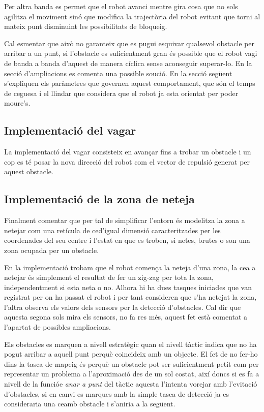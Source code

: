 Per altra banda es permet que el robot avanci mentre gira cosa que no sols agilitza el moviment sinó que
modifica la trajectòria del robot evitant que torni al mateix punt disminuint les possibilitats de bloqueig.

Cal esmentar que això no garanteix que es pugui esquivar qualsevol obstacle per arribar a un punt, 
si l'obstacle es suficientment gran és possible que el robot vagi de banda a banda d'aquest de manera
cíclica sense aconseguir superar-lo. En la secció d'ampliacions es comenta una possible so\lgem ució. En
la secció següent s'expliquen els paràmetres que governen aquest comportament, que són el temps
de ceguesa i el llindar que considera que el robot ja esta orientat per poder moure's.

\subsection{Implementació del vagar}

La implementació del vagar consisteix en avançar fins a trobar un obstacle i un cop es té posar 
la nova direcció del robot com el vector de repulsió generat per aquest obstacle.

\subsection{Implementació de la zona de neteja}

Finalment comentar que per tal de simplificar l'entorn és modelitza la zona a netejar com una retícula
de ce\lgem d'igual dimensió caracteritzades per les coordenades del seu centre i l'estat en que es troben,
si netes, brutes o son una zona ocupada per un obstacle.

En la implementació trobam que el robot comença la neteja d'una zona, la ce\lgem a a netejar és simplement
el resultat de fer un zig-zag per tota la zona, independentment si esta neta o no. Alhora hi ha dues tasques
iniciades que van registrat per on ha passat el robot i per tant consideren que s'ha netejat la zona, l'altra
observa els valors dels sensors per la detecció d'obstacles. Cal dir que aquesta segona sols mira els sensors,
no fa res més, aquest fet està comentat a l'apartat de possibles ampliacions.

Els obstacles es marquen a nivell estratègic quan el nivell tàctic indica que no ha pogut arribar a aquell
punt perquè coincideix amb un objecte. El fet de no fer-ho dins la tasca de mapeig és perquè un obstacle
pot ser suficientment petit com per representar un problema a l'aproximació des de un sol costat, així doncs
si es fa a nivell de la funcióe \emph{anar a punt} del tàctic aquesta l'intenta vorejar amb l'evitació d'obstacles, 
si en canvi es marques amb la simple tasca de detecció ja es consideraria una ce\lgema amb obstacle i s'aniria a la següent.

